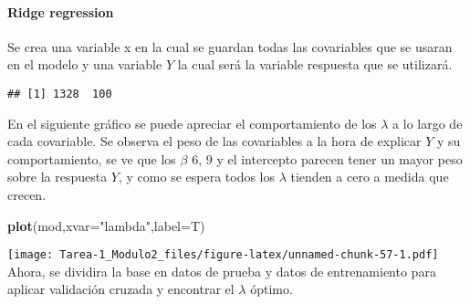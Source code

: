 \documentclass[
]{article}
\newenvironment{Shaded}{\begin{snugshade}}{\end{snugshade}}
\newcommand{\CommentTok}[1]{\textcolor[rgb]{0.56,0.35,0.01}{\textit{#1}}}
\newcommand{\DataTypeTok}[1]{\textcolor[rgb]{0.13,0.29,0.53}{#1}}
\newcommand{\DecValTok}[1]{\textcolor[rgb]{0.00,0.00,0.81}{#1}}
\newcommand{\KeywordTok}[1]{\textcolor[rgb]{0.13,0.29,0.53}{\textbf{#1}}}
\newcommand{\NormalTok}[1]{#1}
\newcommand{\OperatorTok}[1]{\textcolor[rgb]{0.81,0.36,0.00}{\textbf{#1}}}
\newcommand{\StringTok}[1]{\textcolor[rgb]{0.31,0.60,0.02}{#1}}
\begin{document}
\hypertarget{ridge-regression}{%
\paragraph{Ridge regression}\label{ridge-regression}}

Se crea una variable x en la cual se guardan todas las covariables que
se usaran en el modelo y una variable \(Y\) la cual será la variable
respuesta que se utilizará.

\begin{Shaded}
\end{Shaded}

\begin{verbatim}
## [1] 1328  100
\end{verbatim}

En el siguiente gráfico se puede apreciar el comportamiento de los
\(\lambda\) a lo largo de cada covariable. Se observa el peso de las
covariables a la hora de explicar \(Y\) y su comportamiento, se ve que
los \(\beta\) \(6\), \(9\) y el intercepto parecen tener un mayor peso
sobre la respuesta \(Y\), y como se espera todos los \(\lambda\) tienden
a cero a medida que crecen.

\begin{Shaded}
\begin{Highlighting}[]
\KeywordTok{plot}\NormalTok{(mod,}\DataTypeTok{xvar=}\StringTok{"lambda"}\NormalTok{,}\DataTypeTok{label=}\NormalTok{T)}
\end{Highlighting}
\end{Shaded}

\texttt{[image: Tarea-1\_Modulo2\_files/figure-latex/unnamed-chunk-57-1.pdf]}
Ahora, se dividira la base en datos de prueba y datos de entrenamiento
para aplicar validación cruzada y encontrar el \(\lambda\) óptimo.
\end{document}
